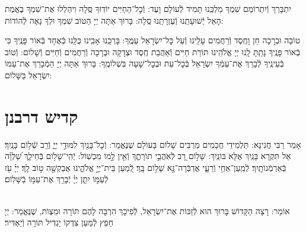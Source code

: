 \documentclass[twoside, openany, parskip=half, 11pt]{book}
\begin{document}
\nextpage

יִתְבָּרַךְ וְֿיִתְרוֹמַם שִׁמְךָ מַלְכֵּֽנוּ תָּמִיד לְֿעוֹלָם וָעֶד:
וְֿכׇל־הַחַיִּים יוֹדֽוּךָ סֶּֽלָה וִיהַלְלוּ אֶת־שִׁמְךָ בֶּאֱמֶת הָאֵל יְֿשׁוּעָתֵֽנוּ וְֿעֶזְרָתֵֽנוּ סֶֽלָה: בָּרוּךְ אַתָּה יְיָ הַטּוֹב שִׁמְךָ וּלְךָ נָאֶה לְֿהוֹדוֹת:

\shatzbrikaskohanim

טוֹבָה וּבְרָכָה חֵן וָחֶֽסֶד וְֿרַחֲמִים עָלֵֽינוּ וְֿעַל כׇּל־יִשְׂרָאֵל עַמֶּֽךָ: בָּרְכֵֽנוּ אָבִֽינוּ כֻּלָּֽנוּ כְּֿאֶחָד בְּֿאוֹר פָּנֶֽיךָ כִּי בְֿאוֹר פָּנֶֽיךָ נָתַֽתָּ לָֽנוּ יְיָ אֱלֹהֵֽינוּ תּוֹרַת חַיִּים וְֿאַהֲבַת חֶֽסֶד וּצְדָקָה וּבְרָכָה וְֿרַחֲמִים וְֿחַיִּים וְֿשָׁלוֹם: וְֿטוֹב בְּֿעֵינֶֽיךָ לְֿבָרֵךְ אֶת־עַמְּֿךָ יִשְׂרָאֵל בְּֿכׇל־עֵת וּבְכׇל־שָׁעָה בִּשְׁלוֹמֶֽךָ: בָּרוּךְ אַתָּה יְיָ הַמְֿבָרֵךְ אֶת־עַמּוֹ יִשְׂרָאֵל בַּשָּׁלוֹם:

\tachanunim

\vfill


\sepline


\chapter[קדיש דרבנן]{ קדיש דרבנן }
\label{kaddish derabonan}


אָמַר רַבִּי חֲנִינָא: תַּלְמִידֵי חֲכָמִים מַרְבִּים שָׁלוֹם בָּעוֹלָם שֶׁנֶּאֱמַר: וְֿכׇל־בָּנַ֖יִךְ לִמּוּדֵ֣י יְיָ֑ וְֿרַ֖ב שְֿׁל֥וֹם בָּנָֽיִךְ׃ אַל תִּקְרָא בָּנַֽיִךְ אֶלָּא בּוֹנַֽיִךְ: שָׁל֣וֹם רָ֭ב לְֿאֹֽהֲבֵ֣י תוֹרָתֶ֑ךָ וְֿאֵ֖ין לָ֣מוֹ מִכְשֽׁוֹל: יְֿהִֽי־שָׁל֥וֹם בְּֿחֵילֵ֑ךְ שַׁ֝לְוָ֗ה בְּֿאַרְמְֿנוֹתָֽיִךְ׃ לְֿמַֽעַן־אַחַ֥י וְֿרֵעָ֑י אֲדַבְּֿרָה־נָּ֖א שָׁל֣וֹם בָּֽךְ׃ לְֿ֭מַעַן בֵּית־יְיָ֣ אֱלֹהֵ֑ינוּ אֲבַקְשָׁ֖ה ט֣וֹב לָֽךְ׃ יְיָ֗ עֹ֖ז לְֿעַמּ֣וֹ יִתֵּ֑ן יְיָ֓ יְֿבָרֵ֖ךְ אֶת־עַמּ֣וֹ בַֿשָּׁלֽוֹם׃

\\
אוֹמֵר: רָצָה הַקָּדוֹשׁ בָּרוּךְ הוּא לְֿזַכּוֹת אֶת־יִשְׂרָאֵל, לְֿפִיכָךְ הִרְבָּה לָהֶם תּוֹרָה וּמִצְוֹת, שֶׁנֶּאֱמַר:
יְיָ חָפֵץ לְֿמַעַן צִדְקוֹ יַגְדִּיל תּוֹרָה וְֿיַאְדִּיר׃


\begin{kaddish}

\rabbiskaddish
\end{kaddish}
\end{document}
